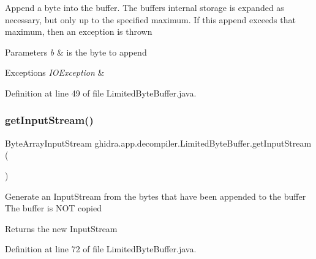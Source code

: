 Append a byte into the buffer. The buffer\textquotesingle{}s internal storage is expanded as necessary, but only up to the specified maximum. If this append exceeds that maximum, then an exception is thrown 
\begin{DoxyParams}{Parameters}
{\em b} & is the byte to append \\
\hline
\end{DoxyParams}

\begin{DoxyExceptions}{Exceptions}
{\em I\+O\+Exception} & \\
\hline
\end{DoxyExceptions}


Definition at line 49 of file Limited\+Byte\+Buffer.\+java.

\mbox{\label{classghidra_1_1app_1_1decompiler_1_1_limited_byte_buffer_af3478c305c9bd3447aff656ba4376d9d}} 
\subsubsection{\texorpdfstring{getInputStream()}{getInputStream()}}
{\footnotesize\ttfamily Byte\+Array\+Input\+Stream ghidra.\+app.\+decompiler.\+Limited\+Byte\+Buffer.\+get\+Input\+Stream (\begin{DoxyParamCaption}{ }\end{DoxyParamCaption})\hspace{0.3cm}{\ttfamily [inline]}}

Generate an Input\+Stream from the bytes that have been appended to the buffer The buffer is N\+OT copied \begin{DoxyReturn}{Returns}
the new Input\+Stream 
\end{DoxyReturn}


Definition at line 72 of file Limited\+Byte\+Buffer.\+java.

